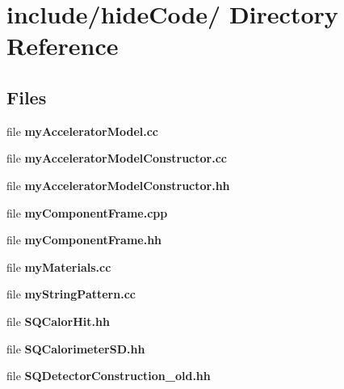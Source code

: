 \section{include/hide\-Code/ Directory Reference}
\label{dir_000005}
\subsection*{Files}
\begin{CompactItemize}
\item 
file {\bf myAcceleratorModel.cc}
\item 
file {\bf myAcceleratorModelConstructor.cc}
\item 
file {\bf myAcceleratorModelConstructor.hh}
\item 
file {\bf myComponentFrame.cpp}
\item 
file {\bf myComponentFrame.hh}
\item 
file {\bf myMaterials.cc}
\item 
file {\bf myStringPattern.cc}
\item 
file {\bf SQCalorHit.hh}
\item 
file {\bf SQCalorimeterSD.hh}
\item 
file {\bf SQDetectorConstruction_old.hh}
\end{CompactItemize}
